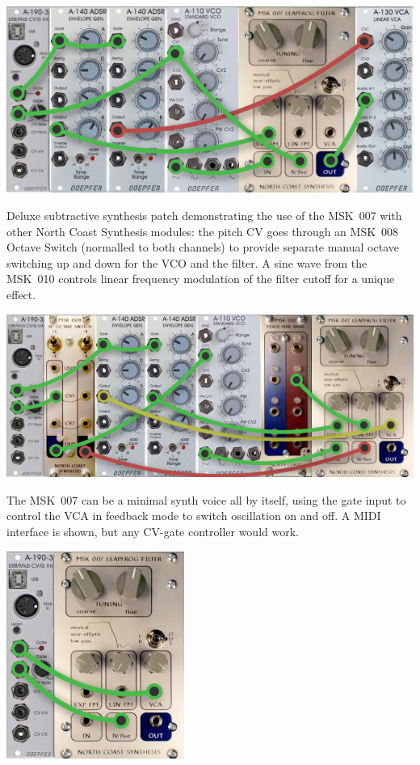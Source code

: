 \nopagebreak\noindent
{\hspace*{\fill}\includegraphics[scale=0.45]{patch2.png}\hspace*{\fill}\par} 

Deluxe subtractive synthesis patch demonstrating the use of the MSK~007 with
other North Coast Synthesis modules: the pitch CV goes through an MSK~008
Octave Switch (normalled to both channels) to provide separate manual octave
switching up and down for the VCO and the filter.  A sine wave from the
MSK~010 controls linear frequency modulation of the filter cutoff for a
unique effect.

\nopagebreak\noindent
{\hspace*{\fill}\includegraphics[scale=0.45]{patch3.png}\hspace*{\fill}\par} 

\pagebreak

The MSK~007 can be a minimal synth voice all by itself, using the
gate input to control the VCA in feedback mode to switch oscillation on and
off.  A MIDI interface is shown, but any CV-gate controller would work.

\nopagebreak\noindent
{\hspace*{\fill}\includegraphics[scale=0.6]{patch4.png}\hspace*{\fill}\par} 

